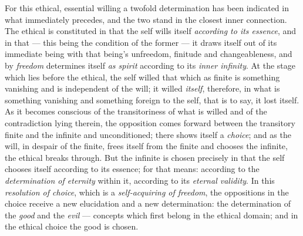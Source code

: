 \documentclass[12pt,a4paper]{book}
\begin{document}
For this ethical, essential willing a twofold determination has been indicated
in what immediately precedes, and the two stand in the closest inner
connection. The ethical is constituted in that the self wills itself
\emph{according to its essence}, and in that --- this being the condition of
the former --- it draws itself out of its immediate being with that being's
unfreedom, finitude and changeableness, and by \emph{freedom} determines
itself \emph{as spirit} according to its \emph{inner infinity}. At the stage
which lies before the ethical, the self willed that which as finite is
something vanishing and is independent of the will; it willed \emph{itself},
therefore, in what is something vanishing and something foreign to the self,
that is to say, it lost itself. As it becomes conscious of the transitoriness
of what is willed and of the contradiction lying therein, the opposition comes
forward between the transitory finite and the infinite and unconditioned;
there shows itself a \emph{choice}; and as the will, in despair of the finite,
frees itself from the finite and chooses the infinite, the ethical breaks
through. But the infinite is chosen precisely in that the self chooses itself
according to its essence; for that means: according to the
\emph{determination of eternity} within it, according to its \emph{eternal
validity}. In this \emph{resolution of choice}, which is a \emph{self-acquiring
of freedom}, the oppositions in the choice receive a new elucidation and a new
\setcounter{footnote}{0}%
determination: the determination of the \emph{good} and the \emph{evil} ---
concepts which first belong in the ethical domain; and in the ethical choice
the good is chosen.
\end{document}
